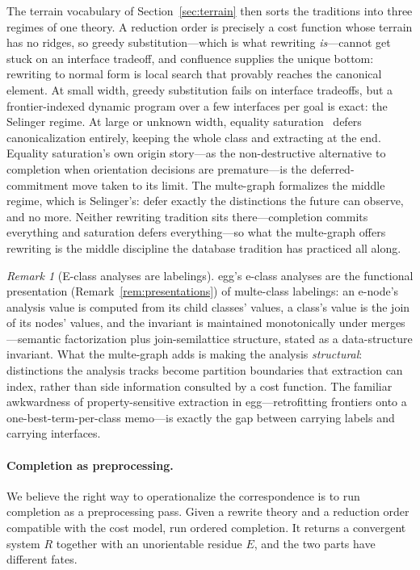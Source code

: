 \documentclass[sigconf,nonacm]{acmart}
\theoremstyle{definition}
\theoremstyle{plain}
\theoremstyle{remark}
\newtheorem{remark}[definition]{Remark}
\begin{document}
The terrain vocabulary of Section~\ref{sec:terrain} then sorts the
traditions into three regimes of one theory.  A reduction order is
precisely a cost function whose terrain has no ridges, so greedy
substitution---which is what rewriting \emph{is}---cannot get stuck
on an interface tradeoff, and confluence supplies the unique bottom:
rewriting to normal form is local search that provably reaches the
canonical element.  At small width, greedy substitution fails on
interface tradeoffs, but a frontier-indexed dynamic program over a
few interfaces per goal is exact: the Selinger regime.  At large or
unknown width, equality
saturation~\cite{tate2009equality,willsey2021egg} defers
canonicalization entirely, keeping the whole class and extracting at
the end.  Equality saturation's own origin story---as the
non-destructive alternative to completion when orientation decisions
are premature---is the deferred-commitment move taken to its limit.
The multe-graph formalizes the middle regime, which is Selinger's:
defer exactly the distinctions the future can observe, and no more.
Neither rewriting tradition sits there---completion commits
everything and saturation defers everything---so what the
multe-graph offers rewriting is the middle discipline the database
tradition has practiced all along.

\begin{remark}[E-class analyses are labelings]
egg's e-class analyses are the functional presentation
(Remark~\ref{rem:presentations}) of multe-class labelings: an
e-node's analysis value is computed from its child classes' values,
a class's value is the join of its nodes' values, and the invariant
is maintained monotonically under merges---semantic factorization
plus join-semilattice structure, stated as a data-structure
invariant.  What the multe-graph adds is making the analysis
\emph{structural}: distinctions the analysis tracks become partition
boundaries that extraction can index, rather than side information
consulted by a cost function.  The familiar awkwardness of
property-sensitive extraction in egg---retrofitting frontiers onto a
one-best-term-per-class memo---is exactly the gap between carrying
labels and carrying interfaces.
\end{remark}

\paragraph{Completion as preprocessing.}

We believe the right way to operationalize the correspondence is to
run completion as a preprocessing pass.  Given a rewrite theory and
a reduction order compatible with the cost model, run ordered
completion.  It returns a convergent system $R$ together with an
unorientable residue $E$, and the two parts have different fates.
\end{document}
